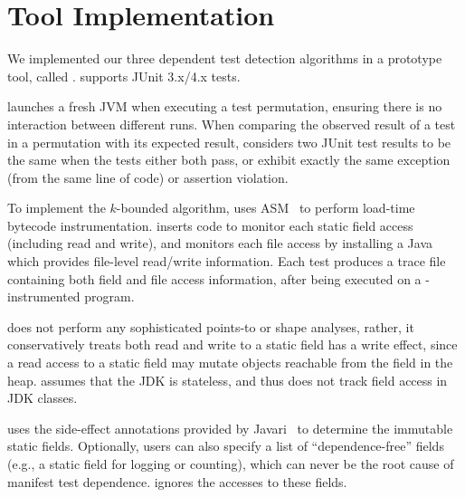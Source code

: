 \section{Tool Implementation}
\label{sec:impl}


We implemented our three dependent test detection algorithms in
a prototype tool, called \ourtool. \ourtool
supports JUnit 3.x/4.x tests. %

\ourtool launches a fresh JVM
when executing a test permutation, ensuring there is no interaction between
different runs. When comparing the observed result of
a test in a permutation with its expected result,
\ourtool considers two JUnit test results to be the same when the
tests either both pass, or exhibit exactly the same exception
(from the same line of code) or assertion violation.

To implement the \dependenceaware{} $k$-bounded
algorithm, \ourtool uses ASM~\cite{asm} to perform load-time bytecode
instrumentation. \ourtool inserts code to monitor each
static field access (including read and write), and
monitors each file access by
installing a Java  which provides 
file-level read/write information.
Each test produces a trace file containing both
field and file access information, after being executed
on a \ourtool-instrumented program.

\ourtool does not perform any sophisticated points-to or shape
analyses, rather, it conservatively treats both read
and write to a static field has a write effect,
since a read access to a static field may mutate objects
reachable from the field in the heap.
\ourtool assumes that the JDK is stateless,
and thus does not track field access in JDK classes. 



\ourtool uses the side-effect annotations
provided by Javari~\cite{QuinonezTE2008} to determine the immutable
static fields. Optionally, users can also specify a
list of ``dependence-free'' fields (e.g., a static field for
logging or counting), which can never be the root cause of manifest test dependence.
\ourtool ignores the accesses to these fields.

